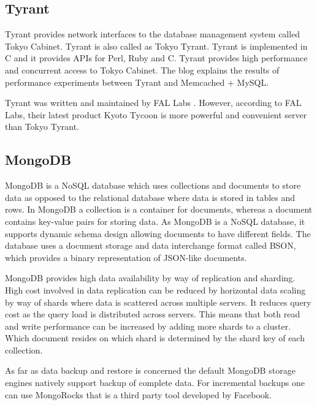 \subsection{ Tyrant}

     Tyrant provides network interfaces to the database management
     system called Tokyo Cabinet. Tyrant is also called as Tokyo
     Tyrant. Tyrant is implemented in C and it provides APIs for Perl,
     Ruby and C. Tyrant provides high performance and concurrent
     access to Tokyo Cabinet. The blog \cite{www-tyrant-blog} 
     explains the results of performance experiments between Tyrant and 
     Memcached + MySQL.

     Tyrant was written and maintained by FAL Labs
     \cite{www-tyrant-fal-labs}.  However, according to FAL Labs,
     their latest product \cite{www-kyoto-tycoon} Kyoto Tycoon is
     more powerful and convenient server than Tokyo Tyrant.


\subsection{ MongoDB}

     MongoDB is a NoSQL database which uses collections and documents
     to store data as opposed to the relational database where data is
     stored in tables and rows. In MongoDB a collection is a container
     for documents, whereas a document contains key-value pairs for
     storing data. As MongoDB is a NoSQL database, it supports dynamic
     schema design allowing documents to have different fields. The
     database uses a document storage and data interchange format
     called BSON, which provides a binary representation of JSON-like
     documents.

     MongoDB provides high data availability by way of replication and
     sharding. High cost involved in data replication can be reduced
     by horizontal data scaling by way of shards where data is
     scattered across multiple servers. It reduces query cost as the
     query load is distributed across servers. This means that both
     read and write performance can be increased by adding more shards
     to a cluster. Which document resides on which shard is determined
     by the shard key of each collection.

     As far as data backup and restore is concerned the default
     MongoDB storage engines natively support backup of complete
     data. For incremental backups one can use MongoRocks that is a
     third party tool developed by Facebook.

